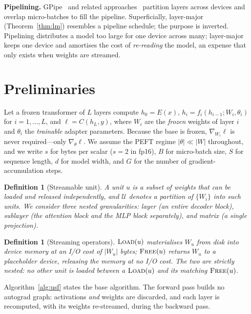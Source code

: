 \documentclass[preprint,12pt]{elsarticle}
\newtheorem{definition}[theorem]{Definition}
\newcommand{\Wu}{\lvert W_u \rvert}
\begin{document}
\textbf{Pipelining.} GPipe~\cite{huang2019gpipe} and related
approaches~\cite{jia2019beyond} partition layers across devices and overlap micro-batches to fill
the pipeline. Superficially, layer-major (Theorem~\ref{thm:lm}) resembles a pipeline schedule; the purpose
is inverted. Pipelining distributes a model too large for one device across many; layer-major keeps
one device and amortises the cost of \emph{re-reading} the model, an expense that only exists when
weights are streamed.

\section{Preliminaries}
\label{sec:prelim}

Let a frozen transformer of $L$ layers compute $h_0 = E(x)$,
$h_i = f_i(h_{i-1}; W_i, \theta_i)$ for $i=1,\dots,L$, and $\ell = C(h_L,y)$, where $W_i$ are the
\emph{frozen} weights of layer $i$ and $\theta_i$ the \emph{trainable} adapter parameters. Because
the base is frozen, $\nabla_{W_i}\ell$ is never required---only $\nabla_{\theta}\ell$. We assume
the PEFT regime $|\theta| \ll |W|$ throughout, and we write $s$ for bytes per scalar ($s=2$ in
fp16), $B$ for micro-batch size, $S$ for sequence length, $d$ for model width, and $G$ for the
number of gradient-accumulation steps.

\begin{definition}[Streamable unit]
\label{def:unit}
A \emph{unit} $u$ is a subset of weights that can be loaded and released independently, and
$\mathcal{U}$ denotes a partition of $\{W_i\}$ into such units. We consider three nested
granularities: \emph{layer} (an entire decoder block), \emph{sublayer} (the attention block and
the MLP block separately), and \emph{matrix} (a single projection).
\end{definition}

\begin{definition}[Streaming operators]
\label{def:ops}
$\textsc{Load}(u)$ materialises $W_u$ from disk into device memory at an I/O cost of $\Wu$ bytes;
$\textsc{Free}(u)$ returns $W_u$ to a placeholder device, releasing the memory at no I/O cost. The
two are strictly nested: no other unit is loaded between a $\textsc{Load}(u)$ and its matching
$\textsc{Free}(u)$.
\end{definition}

Algorithm~\ref{alg:usf} states the base algorithm. The forward pass builds no autograd graph: activations
\emph{and} weights are discarded, and each layer is recomputed, with its weights re-streamed,
during the backward pass.
\end{document}
